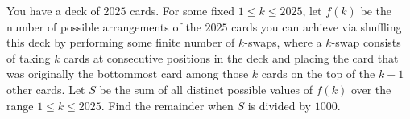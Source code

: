 You have a deck of $2025$ cards. For some fixed $1 \leq k \leq 2025$, let $f(k)$ be the number of possible arrangements of the $2025$ cards you can achieve via shuffling this deck by performing some finite number of $k$-swaps, where a $k$-swap consists of taking $k$ cards at consecutive positions in the deck and placing the card that was originally the bottommost card among those $k$ cards on the top of the $k-1$ other cards. Let $S$ be the sum of all distinct possible values of $f(k)$ over the range $1 \leq k \leq 2025.$ Find the remainder when $S$ is divided by $1000$.
